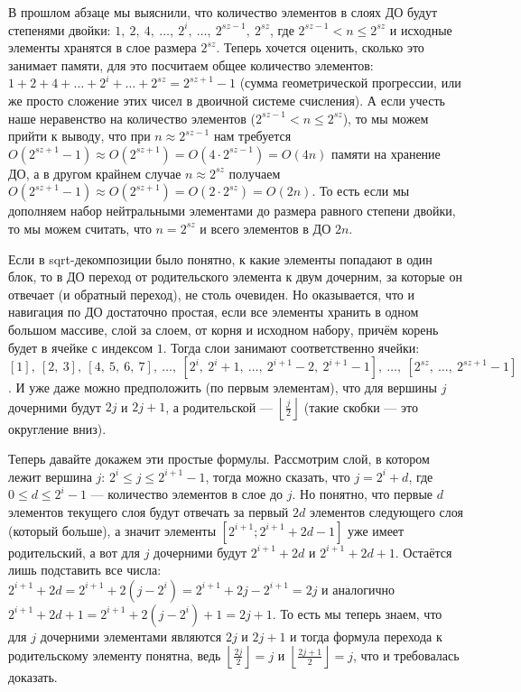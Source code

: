В прошлом абзаце мы выяснили, что количество элементов в слоях ДО будут степенями двойки: $1,\ 2,\ 4,\ \ldots,\ 2^i,\ \ldots,\ 2^{sz - 1},\ 2^{sz}$, где $2^{sz - 1} < n \leq 2^{sz}$ и исходные элементы хранятся в слое размера $2^{sz}$. Теперь хочется оценить, сколько это занимает памяти, для это посчитаем общее количество элементов: $1 + 2 + 4 + \ldots + 2^i + \ldots + 2^{sz} = 2^{sz + 1} - 1$ (сумма геометрической прогрессии, или же просто сложение этих чисел в двоичной системе счисления). А если учесть наше неравенство на количество элементов ($2^{sz - 1} < n \leq 2^{sz}$), то мы можем прийти к выводу, что при $n \approx 2^{sz - 1}$ нам требуется $O(2^{sz + 1} - 1) \approx O(2^{sz + 1}) = O(4 \cdot 2^{sz - 1}) = O(4n)$ памяти на хранение ДО, а в другом крайнем случае $n \approx 2^{sz}$ получаем $O(2^{sz + 1} - 1) \approx O(2^{sz + 1}) = O(2 \cdot 2^{sz}) = O(2n)$. То есть если мы дополняем набор нейтральными элементами до размера равного степени двойки, то мы можем считать, что $n = 2^{sz}$ и всего элементов в ДО $2n$.

Если в sqrt-декомпозиции было понятно, к какие элементы попадают в один блок, то в ДО переход от родительского элемента к двум дочерним, за которые он отвечает (и обратный переход), не столь очевиден. Но оказывается, что и навигация по ДО достаточно простая, если все элементы хранить в одном большом массиве, слой за слоем, от корня и исходном набору, причём корень будет в ячейке с индексом $1$. Тогда слои занимают соответственно ячейки: $[1],\ [2,\ 3],\ [4,\ 5,\ 6,\ 7],\ \ldots,\ [2^i,\ 2^i + 1,\ \ldots,\ 2^{i + 1} - 2,\ 2^{i + 1} - 1],\ \ldots,\ [2^{sz},\ \ldots,\ 2^{sz + 1} - 1]$. И уже даже можно предположить (по первым элементам), что для вершины $j$ дочерними будут $2j$ и $2j + 1$, а родительской — $\left\lfloor \frac{j}{2} \right\rfloor$ (такие скобки — это округление вниз).

Теперь давайте докажем эти простые формулы. Рассмотрим слой, в котором лежит вершина $j$: $2^i \leq j \leq 2^{i + 1} - 1$, тогда можно сказать, что $j = 2^i + d$, где $0 \leq d \leq 2^i - 1$ — количество элементов в слое до $j$. Но понятно, что первые $d$ элементов текущего слоя будут отвечать за первый $2d$ элементов следующего слоя (который больше), а значит элементы $[2^{i + 1}; 2^{i + 1} + 2d - 1]$ уже имеет родительский, а вот для $j$ дочерними будут $2^{i + 1} + 2d$ и $2^{i + 1} + 2d + 1$. Остаётся лишь подставить все числа: $2^{i + 1} + 2d = 2^{i + 1} + 2(j - 2^i) = 2^{i + 1} + 2j - 2^{i + 1} = 2j$ и аналогично $2^{i + 1} + 2d + 1 = 2^{i + 1} + 2(j - 2^i) + 1 = 2j + 1$. То есть мы теперь знаем, что для $j$ дочерними элементами являются $2j$ и $2j + 1$ и тогда формула перехода к родительскому элементу понятна, ведь $\left\lfloor \frac{2j}{2} \right\rfloor = j$ и $\left\lfloor \frac{2j + 1}{2} \right\rfloor = j$, что и требовалась доказать.

